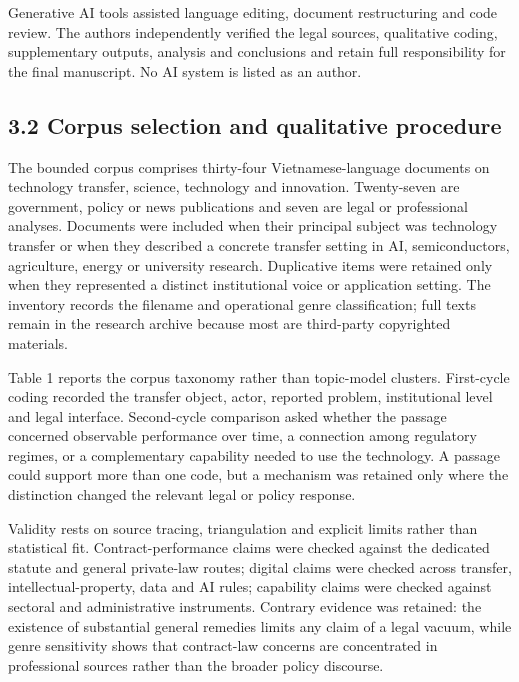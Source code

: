 \documentclass[
]{article}
\begin{document}
Generative AI tools assisted language editing, document restructuring
and code review. The authors independently verified the legal sources,
qualitative coding, supplementary outputs, analysis and conclusions and
retain full responsibility for the final manuscript. No AI system is
listed as an author.

\subsection{3.2 Corpus selection and qualitative
procedure}\label{corpus-selection-and-qualitative-procedure}

The bounded corpus comprises thirty-four Vietnamese-language documents
on technology transfer, science, technology and innovation. Twenty-seven
are government, policy or news publications and seven are legal or
professional analyses. Documents were included when their principal
subject was technology transfer or when they described a concrete
transfer setting in AI, semiconductors, agriculture, energy or
university research. Duplicative items were retained only when they
represented a distinct institutional voice or application setting. The
inventory records the filename and operational genre classification;
full texts remain in the research archive because most are third-party
copyrighted materials.

Table 1 reports the corpus taxonomy rather than topic-model clusters.
First-cycle coding recorded the transfer object, actor, reported
problem, institutional level and legal interface. Second-cycle
comparison asked whether the passage concerned observable performance
over time, a connection among regulatory regimes, or a complementary
capability needed to use the technology. A passage could support more
than one code, but a mechanism was retained only where the distinction
changed the relevant legal or policy response.

Validity rests on source tracing, triangulation and explicit limits
rather than statistical fit. Contract-performance claims were checked
against the dedicated statute and general private-law routes; digital
claims were checked across transfer, intellectual-property, data and AI
rules; capability claims were checked against sectoral and
administrative instruments. Contrary evidence was retained: the
existence of substantial general remedies limits any claim of a legal
vacuum, while genre sensitivity shows that contract-law concerns are
concentrated in professional sources rather than the broader policy
discourse.
\end{document}
